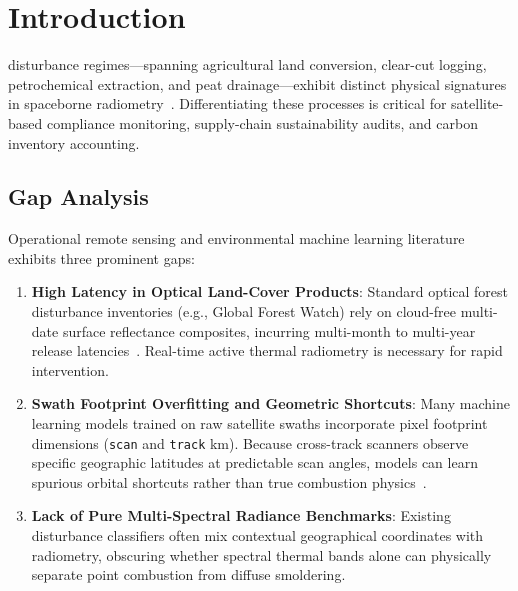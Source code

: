 \documentclass[conference]{IEEEtran}
\begin{document}
\section{Introduction}
 disturbance regimes---spanning agricultural land conversion, clear-cut logging, petrochemical extraction, and peat drainage---exhibit distinct physical signatures in spaceborne radiometry~\cite{schroeder2014,wooster2005}. Differentiating these processes is critical for satellite-based compliance monitoring, supply-chain sustainability audits, and carbon inventory accounting.

\subsection{Gap Analysis}
\label{sec:gap_analysis}
Operational remote sensing and environmental machine learning literature exhibits three prominent gaps:
\begin{enumerate}
    \item \textbf{High Latency in Optical Land-Cover Products}: Standard optical forest disturbance inventories (e.g., Global Forest Watch) rely on cloud-free multi-date surface reflectance composites, incurring multi-month to multi-year release latencies~\cite{hansen2013}. Real-time active thermal radiometry is necessary for rapid intervention.
    \item \textbf{Swath Footprint Overfitting and Geometric Shortcuts}: Many machine learning models trained on raw satellite swaths incorporate pixel footprint dimensions (\texttt{scan} and \texttt{track} km). Because cross-track scanners observe specific geographic latitudes at predictable scan angles, models can learn spurious orbital shortcuts rather than true combustion physics~\cite{wolfe2002,geirhos2020}.
    \item \textbf{Lack of Pure Multi-Spectral Radiance Benchmarks}: Existing disturbance classifiers often mix contextual geographical coordinates with radiometry, obscuring whether spectral thermal bands alone can physically separate point combustion from diffuse smoldering.
\end{enumerate}
\end{document}
